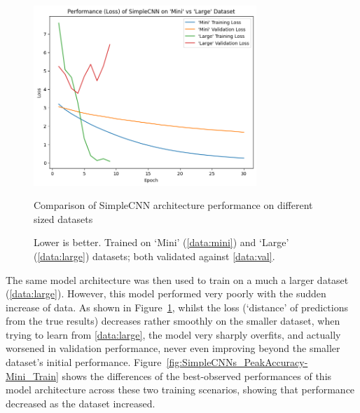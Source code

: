                 \begin{figure}[H]
                    \centering
                    \includegraphics[width=0.75\textwidth]{images/SimpleCNNs_TrainLoss.png}
                    \caption{Comparison of SimpleCNN architecture performance on different sized datasets}
                    \label{fig:SimpleCNNs_TrainLoss-Mini_Train}
                    \caption*{Lower is better. Trained on `Mini' (\ref{data:mini}) and `Large' (\ref{data:large}) datasets; both validated against \ref{data:val}.}
                \end{figure}
    
                The same model architecture was then used to train on a much a larger dataset (\ref{data:large}). However, this model performed very poorly with the sudden increase of data. As shown in Figure~\ref{fig:SimpleCNNs_TrainLoss-Mini_Train}, whilst the loss (`distance' of predictions from the true results) decreases rather smoothly on the smaller dataset, when trying to learn from \ref{data:large}, the model very sharply overfits, and actually worsened in validation performance, never even improving beyond the smaller dataset's initial performance. Figure~\ref{fig:SimpleCNNs_PeakAccuracy-Mini_Train} shows the differences of the best-observed performances of this model architecture across these two training scenarios, showing that performance decreased as the dataset increased.
        
